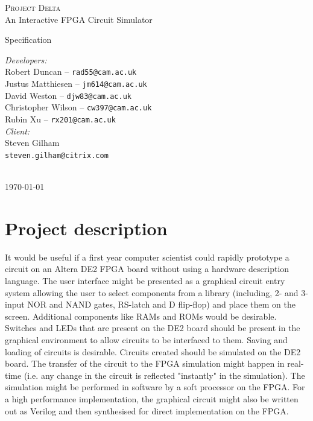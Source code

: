\documentclass[12pt, a4paper, oneside,titlepage]{article}
\begin{document}
 \begin{titlepage}
 \begin{center}
 \textsc{\huge{Project Delta}} \\
 {\Large{An Interactive FPGA Circuit Simulator}}
\end{center}
\vspace{10em}
 \begin{center}
{\huge{Specification}}
\end{center}
\vfill
\setlength{\columnsep}{10em}
\begin{multicols}{2}{
\emph{Developers:}\\
Robert Duncan -- \texttt{rad55@cam.ac.uk} \\
Justus Matthiesen -- \texttt{jm614@cam.ac.uk}\\
David Weston -- \texttt{djw83@cam.ac.uk}\\
Christopher Wilson -- \texttt{cw397@cam.ac.uk}\\
Rubin Xu -- \texttt{rx201@cam.ac.uk}\\
\emph{Client:}\\
Steven Gilham\\
\texttt{steven.gilham@citrix.com}
\\
\\
}
\end{multicols}
\begin{center}
\today
\end{center}
 \end{titlepage}

\tableofcontents
\newpage
\setlength{\parskip}{\medskipamount}
\section{Project description}
It would be useful if a first year computer scientist could rapidly prototype a circuit on an Altera DE2 FPGA board without using a hardware description language. The user interface might be presented as a graphical circuit entry system allowing the user to select components from a library (including, 2- and 3-input NOR and NAND gates, RS-latch and D flip-flop) and place them on the screen. Additional components like RAMs and ROMs would be desirable. Switches and LEDs that are present on the DE2 board should be present in the graphical environment to allow circuits to be interfaced to them. Saving and loading of circuits is desirable. Circuits created should be simulated on the DE2 board. The transfer of the circuit to the FPGA simulation might happen in real-time (i.e. any change in the circuit is reflected "instantly" in the simulation). The simulation might be performed in software by a soft processor on the FPGA. For a high performance implementation, the graphical circuit might also be written out as Verilog and then synthesised for direct implementation on the FPGA.
\end{document}
